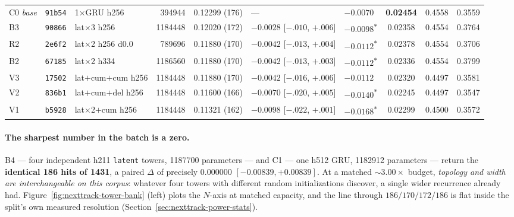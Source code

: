 \documentclass[11pt]{article}
\newcommand{\best}[1]{\textbf{#1}}
\begin{document}
\begin{table}[ht]
{\begin{tabular}{lllrlllccc}
    C0 \emph{base} & \texttt{91b54} & 1$\times$GRU h256 & \num{394944} & 0.12299 (176) & --- & $-0.0070$ & \best{0.02454} & 0.4558 & 0.3559 \\
    B3 & \texttt{90866} & lat$\times$3 h256 & \num{1184448} & 0.12020 (172) & $-0.0028$ [$-.010$, $+.006$] & $\mathbf{-0.0098}$\textsuperscript{$\ast$} & 0.02358 & 0.4554 & 0.3764 \\
    R2 & \texttt{2e6f2} & lat$\times$2 h256 d\num{0.0} & \num{789696} & 0.11880 (170) & $-0.0042$ [$-.013$, $+.004$] & $\mathbf{-0.0112}$\textsuperscript{$\ast$} & 0.02378 & 0.4554 & 0.3706 \\
    B2 & \texttt{67185} & lat$\times$2 h334 & \num{1186560} & 0.11880 (170) & $-0.0042$ [$-.013$, $+.003$] & $\mathbf{-0.0112}$\textsuperscript{$\ast$} & 0.02336 & 0.4554 & 0.3799 \\
    V3 & \texttt{17502} & lat$+$cum$+$cum h256 & \num{1184448} & 0.11880 (170) & $-0.0042$ [$-.016$, $+.006$] & $-0.0112$ & 0.02320 & 0.4497 & 0.3581 \\
    V2 & \texttt{836b1} & lat$+$cum$+$del h256 & \num{1184448} & 0.11600 (166) & $-0.0070$ [$-.020$, $+.005$] & $\mathbf{-0.0140}$\textsuperscript{$\ast$} & 0.02245 & 0.4497 & 0.3547 \\
    V1 & \texttt{b5928} & lat$\times$2$+$cum h256 & \num{1184448} & 0.11321 (162) & $-0.0098$ [$-.022$, $+.001$] & $\mathbf{-0.0168}$\textsuperscript{$\ast$} & 0.02299 & 0.4500 & 0.3572 \\
    \bottomrule
  \end{tabular}}
\end{table}

\paragraph{The sharpest number in the batch is a zero.} B4 --- four independent
h211 \texttt{latent} towers, \num{1187700} parameters --- and C1 --- one h512
GRU, \num{1182912} parameters --- return the \textbf{identical \num{186} hits of
\num{1431}}, a paired $\Delta$ of precisely $\num{0.000000}$
$[-\num{0.00839},+\num{0.00839}]$. At a matched ${\sim}\num{3.00}\times$ budget,
\emph{topology and width are interchangeable on this corpus}: whatever four
towers with different random initializations discover, a single wider recurrence
already had. Figure~\ref{fig:nexttrack-tower-bank} (left) plots the $N$-axis at
matched capacity, and the line through $\num{186}/\num{170}/\num{172}/\num{186}$
is flat inside the split's own measured resolution
(Section~\ref{sec:nexttrack-power-stats}).
\end{document}
